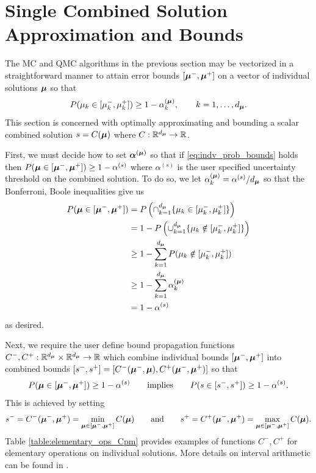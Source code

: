 \documentclass{article}[12pt]
\begin{document}
\section{Single Combined Solution Approximation and Bounds}

The MC and QMC algorithms in the previous section may be vectorized in a straightforward manner to attain error bounds $[\boldsymbol{\mu}^-,\boldsymbol{\mu}^+]$ on a vector of individual solutions $\boldsymbol{\mu}$ so that 
\begin{equation}
    P(\mu_k \in [\mu_k^-,\mu_k^+]) \geq 1-\alpha_k^{(\boldsymbol{\mu})},  \qquad k=1,\dots,d_{\boldsymbol{\mu}}.
    \label{eq:indv_prob_bounds}
\end{equation}
This section is concerned with optimally approximating and bounding a scalar combined solution $s=C(\boldsymbol{\mu})$ where $C: \mathbb{R}^{d_{\boldsymbol{\mu}}} \to \mathbb{R}$. 

First, we  must decide how to set $\boldsymbol{\alpha}^{(\boldsymbol{\mu})}$ so that if \eqref{eq:indv_prob_bounds} holds then $P(\boldsymbol{\mu} \in [\boldsymbol{\mu}^-,\boldsymbol{\mu}^+]) \geq 1-\alpha^{(s)}$ where $\alpha^{(s)}$ is the user specified uncertainty threshold on the combined solution. To do so, we let $\alpha_k^{(\boldsymbol{\mu})} = \alpha^{(s)}/d_{\boldsymbol{\mu}}$ so that the Bonferroni, Boole inequalities give us 
\begin{align*}
    P(\boldsymbol{\mu} \in [\boldsymbol{\mu}^-,\boldsymbol{\mu}^+])
    &= P\left(\cap_{k=1}^{d_{\boldsymbol{\mu}}} \{\mu_k \in [\mu^-_k,\mu^+_k]\}\right) \\
    &= 1-P\left(\cup_{k=1}^{d_{\boldsymbol{\mu}}} \{\mu_k \notin [\mu^-_k,\mu^+_k]\}\right) \\
    &\geq 1-\sum_{k=1}^{d_{\boldsymbol{\mu}}} P(\mu_k \notin [\mu_k^-,\mu_k^+]) \\
    &\geq 1-\sum_{k=1}^{d_{\boldsymbol{\mu}}} \alpha_k^{(\boldsymbol{\mu})} \\
    &= 1-\alpha^{(s)}
\end{align*}
as desired. 

Next, we require the user define bound propagation functions $C^-,C^+: \mathbb{R}^{d_{\boldsymbol{\mu}}} \times \mathbb{R}^{d_{\boldsymbol{\mu}}} \to \mathbb{R}$ which combine individual bounds $[\boldsymbol{\mu}^-,\boldsymbol{\mu}^+]$ into combined bounds $[s^-,s^+] = [C^-(\boldsymbol{\mu}^-,\boldsymbol{\mu}),C^+(\boldsymbol{\mu}^-,\boldsymbol{\mu}^+)]$ so that 
$$P(\boldsymbol{\mu} \in [\boldsymbol{\mu}^-,\boldsymbol{\mu}^+]) \geq 1-\alpha^{(s)} \qquad\text{implies}\qquad  P(s \in [s^-,s^+]) \geq 1-\alpha^{(s)}.$$ This is achieved by setting
\begin{equation*}
    s^- = C^-(\boldsymbol{\mu}^-,\boldsymbol{\mu}^+) = \min_{\boldsymbol{\mu} \in [\boldsymbol{\mu}^-,\boldsymbol{\mu}^+]} C(\boldsymbol{\mu}) \qquad\text{and}\qquad s^+ = C^+(\boldsymbol{\mu}^-,\boldsymbol{\mu}^+) = \max_{\boldsymbol{\mu} \in [\boldsymbol{\mu}^-,\boldsymbol{\mu}^+]} C(\boldsymbol{\mu}).
\end{equation*}
Table \ref{table:elementary_ops_Cpm} provides examples of functions $C^-,C^+$ for elementary operations on individual solutions. More details on interval arithmetic can be found in \cite{interval_analysis}.
 
\end{document}
